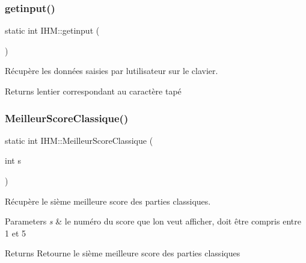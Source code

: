 \subsubsection{\texorpdfstring{getinput()}{getinput()}}
{\footnotesize\ttfamily static int I\+H\+M\+::getinput (\begin{DoxyParamCaption}{ }\end{DoxyParamCaption})\hspace{0.3cm}{\ttfamily [static]}}



Récupère les données saisies par l\textquotesingle{}utilisateur sur le clavier. 

\begin{DoxyReturn}{Returns}
l\textquotesingle{}entier correspondant au caractère tapé 
\end{DoxyReturn}
\mbox{\label{classIHM_a4218e5b720799dd8bada264c7bc0d690}} 
\subsubsection{\texorpdfstring{Meilleur\+Score\+Classique()}{MeilleurScoreClassique()}}
{\footnotesize\ttfamily static int I\+H\+M\+::\+Meilleur\+Score\+Classique (\begin{DoxyParamCaption}\item[{int}]{s }\end{DoxyParamCaption})\hspace{0.3cm}{\ttfamily [static]}}



Récupère le sième meilleure score des parties classiques. 


\begin{DoxyParams}{Parameters}
{\em s} & le numéro du score que l\textquotesingle{}on veut afficher, doit être compris entre 1 et 5 \\
\hline
\end{DoxyParams}
\begin{DoxyReturn}{Returns}
Retourne le sième meilleure score des parties classiques 
\end{DoxyReturn}
\mbox{\label{classIHM_a068cc2350e9f4fc005ad4378f02d62fa}} 
